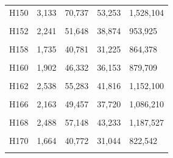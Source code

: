 \documentclass[
  a4paper,
  titlepage]{article}
\begin{document}
\begin{longtable}[t]{lllll}
H150 & 3,133 & 70,737 & 53,253 & 1,528,104\\
 
\cellcolor{gray!6}{H151} & \cellcolor{gray!6}{2,773} & \cellcolor{gray!6}{63,572} & \cellcolor{gray!6}{47,901} & \cellcolor{gray!6}{1,350,679}\\
 
H152 & 2,241 & 51,648 & 38,874 & 953,925\\
 
\cellcolor{gray!6}{H157} & \cellcolor{gray!6}{1,946} & \cellcolor{gray!6}{45,708} & \cellcolor{gray!6}{34,945} & \cellcolor{gray!6}{1,013,806}\\
 
H158 & 1,735 & 40,781 & 31,225 & 864,378\\
 
\cellcolor{gray!6}{H159} & \cellcolor{gray!6}{2,481} & \cellcolor{gray!6}{56,224} & \cellcolor{gray!6}{42,130} & \cellcolor{gray!6}{1,096,318}\\
 
H160 & 1,902 & 46,332 & 36,153 & 879,709\\
 
\cellcolor{gray!6}{H161} & \cellcolor{gray!6}{1,996} & \cellcolor{gray!6}{48,298} & \cellcolor{gray!6}{37,918} & \cellcolor{gray!6}{1,044,229}\\
 
H162 & 2,538 & 55,283 & 41,816 & 1,152,100\\
 
\cellcolor{gray!6}{H164} & \cellcolor{gray!6}{3,115} & \cellcolor{gray!6}{71,758} & \cellcolor{gray!6}{53,708} & \cellcolor{gray!6}{1,457,705}\\
 
H166 & 2,163 & 49,457 & 37,720 & 1,086,210\\
 
\cellcolor{gray!6}{H167} & \cellcolor{gray!6}{2,122} & \cellcolor{gray!6}{49,001} & \cellcolor{gray!6}{38,012} & \cellcolor{gray!6}{940,648}\\
 
H168 & 2,488 & 57,148 & 43,233 & 1,187,527\\
 
\cellcolor{gray!6}{H169} & \cellcolor{gray!6}{2,119} & \cellcolor{gray!6}{49,172} & \cellcolor{gray!6}{37,688} & \cellcolor{gray!6}{1,036,006}\\
 
H170 & 1,664 & 40,772 & 31,044 & 822,542\\
 
\cellcolor{gray!6}{H171} & \cellcolor{gray!6}{2,893} & \cellcolor{gray!6}{63,697} & \cellcolor{gray!6}{47,570} & \cellcolor{gray!6}{1,281,118}\\
 

\end{longtable}
\end{document}
